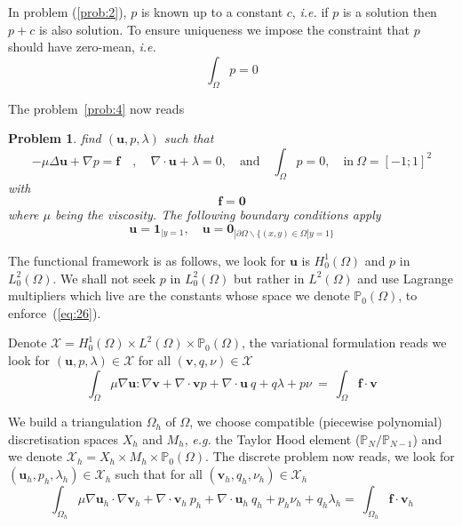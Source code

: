 \documentclass[a4paper]{book}
\newtheorem{problem}{Problem}
\begin{document}
In problem (\ref{prob:2}), $p$ is known up to a constant $c$,
\emph{i.e.} if $p$ is a solution then $p+c$ is also solution. To
ensure uniqueness we impose the constraint that $p$ should have
zero-mean, \emph{i.e.}
\begin{equation}
  \label{eq:26}
  \int_\Omega p = 0
\end{equation}

The problem~\ref{prob:4} now reads
\begin{problem}
  \label{prob:5}
 find $(\mathbf{u},p,\lambda)$ such that
\begin{equation}
  \label{eq:34}
  - \mu \Delta \mathbf{u} +\nabla p = \mathbf{f}\quad, \quad \nabla \cdot \mathbf{u} + \lambda = 0, \quad \text{and}\quad \int_\Omega p = 0,\quad \text{in}\ \Omega = [-1;1]^2
\end{equation}
with
\begin{equation}
  \label{eq:35}
  \mathbf{f} = \mathbf{0}
\end{equation}
where $\mu$ being the viscosity. The following boundary conditions apply
\begin{equation}
  \label{eq:36}
  \mathbf{u}=\mathbf{1}_{|y=1}, \quad \mathbf{u}=\mathbf{0}_{|\partial \Omega \backslash \{(x,y) \in \Omega | y=1\}}
\end{equation}
\end{problem}

The functional framework is as follows, we look for $\mathbf{u}$ is
$H^1_0(\Omega)$ and $p$ in $L^2_0(\Omega)$. We shall not seek $p$ in
$L^2_0(\Omega)$ but rather in $L^2(\Omega)$ and use Lagrange
multipliers which live are the constants whose space we denote
$\mathbb{P}_0(\Omega)$, to enforce~(\ref{eq:26}).

Denote $\mathcal{X} = H^1_0(\Omega)\times
L^2(\Omega)\times\mathbb{P}_0(\Omega)$, the variational formulation
reads we look for $(\mathbf{u}, p, \lambda) \in \mathcal{X}$ for all
$(\mathbf{v},q,\nu) \in \mathcal{X}$
\begin{equation}
  \label{eq:25}
  \int_\Omega \mu \nabla \mathbf{u} : \nabla \mathbf{v} + \nabla \cdot \mathbf{v} p + \nabla \cdot \mathbf{u}\ q + q \lambda + p \nu  \ = \ \int_\Omega \mathbf{f} \cdot \mathbf{v}
\end{equation}

We build a triangulation $\Omega_h$ of $\Omega$, we choose compatible
(piecewise polynomial) discretisation spaces $X_h$ and $M_h$,
\emph{e.g.} the Taylor Hood element ($\mathbb{P}_N/\mathbb{P}_{N-1}$)
and we denote $\mathcal{X}_h=X_h\times M_h \times
\mathbb{P}_0(\Omega)$.  The discrete problem now reads, we look for
$(\mathbf{u}_h,p_h,\lambda_h) \in \mathcal{X}_h$ such that for all
$(\mathbf{v}_h,q_h,\nu_h) \in \mathcal{X}_h$
\begin{equation}
  \label{eq:27}
  \int_{\Omega_h} \mu \nabla \mathbf{u}_h \cdot \nabla \mathbf{v}_h + \nabla \cdot \mathbf{v}_h \ p_h + \nabla \cdot \mathbf{u}_h\ q_h + p_h \nu_h + q_h \lambda_h   = \ \int_{\Omega_h} \mathbf{f} \cdot \mathbf{v}_h
\end{equation}
\end{document}
